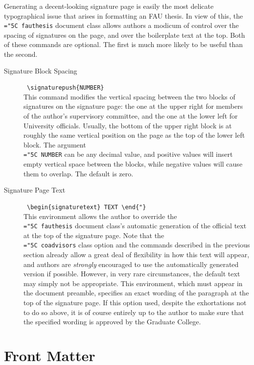 \documentclass[11pt]{article}
\newcommand\code[1]{{\normalfont\texttt{\let\dv\textsl\chardef\\="5C #1}}}
\begin{document}
Generating a decent-looking signature page is easily the most delicate typographical issue that arises in formatting an FAU thesis.  In view of this, the \code{fauthesis} document class allows authors a modicum of control over the spacing of signatures on the page, and over the boilerplate text at the top.  Both of these commands are optional.  The first is much more likely to be useful than the second.
%
\begin{description}

\item[\llap{*}Signature Block Spacing] \dotfill\ \verb=\signaturepush{NUMBER}=\\
This command modifies the vertical spacing between the two blocks of signatures on the signature page: the one at the upper right for members of the author's supervisory committee, and the one at the lower left for University officials.  Usually, the bottom of the upper right block is at roughly the same vertical position on the page as the top of the lower left block.  The argument \code{NUMBER} can be any decimal value, and positive values will insert empty vertical space between the blocks, while negative values will cause them to overlap.  The default is zero.

\item[\llap{*}Signature Page Text] \dotfill\ \verb=\begin{signaturetext} TEXT \end{"}=\\
This environment allows the author to override the \code{fauthesis} document class's automatic generation of the official text at the top of the signature page.  Note that the \code{coadvisors} class option and the commands described in the previous section already allow a great deal of flexibility in how this text will appear, and authors are \textit{strongly} encouraged to use the automatically generated version if possible.  However, in very rare circumstances, the default text may simply not be appropriate.  This environment, which must appear in the document preamble, specifies an exact wording of the paragraph at the top of the signature page.  If this option used, despite the exhortations not to do so above, it is of course entirely up to the author to make sure that the specified wording is approved by the Graduate College.

\end{description}


\section{Front Matter}
\end{document}
